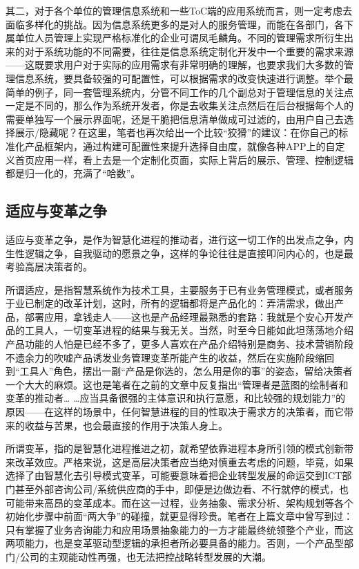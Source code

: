 \documentclass[]{book}
\begin{document}
其二，对于各个单位的管理信息系统和一些ToC端的应用系统而言，则一定考虑去面临多样化的挑战。因为信息系统更多的是对人的服务管理，而能在各部门，各下属单位人员管理上实现严格标准化的企业可谓凤毛麟角。不同的管理需求所衍生出来的对于系统功能的不同需要，往往是信息系统定制化开发中一个重要的需求来源------这既要求用户对于实际的应用需求有非常明确的理解，也要求我们大多数的管理信息系统，要具备较强的可配置性，可以根据需求的改变快速进行调整。举个最简单的例子，同一套管理系统内，分管不同工作的几个副总对于管理信息的关注点一定是不同的，那么作为系统开发者，你是去收集关注点然后在后台根据每个人的需要单独写一个展示界面呢，还是干脆把信息清单做成可过滤的，由用户自己去选择展示/隐藏呢？在这里，笔者也再次给出一个比较``狡猾''的建议：在你自己的标准化产品框架内，通过构建可配置性来提升选择自由度，就像各种APP上的自定义首页应用一样，看上去是一个定制化页面，实际上背后的展示、管理、控制逻辑都是归一化的，充满了``哈数''。

\hypertarget{ux9002ux5e94ux4e0eux53d8ux9769ux4e4bux4e89}{%
\subsection{适应与变革之争}\label{ux9002ux5e94ux4e0eux53d8ux9769ux4e4bux4e89}}

适应与变革之争，是作为智慧化进程的推动者，进行这一切工作的出发点之争，内生性逻辑之争，自我驱动的愿景之争，这样的争论往往是直接叩问内心的，也是最考验高层决策者的。

所谓适应，是指智慧系统作为技术工具，主要服务于已有业务管理模式，或者服务于业已制定的改革计划，这时，所有的逻辑都将是产品化的：弄清需求，做出产品，部署应用，拿钱走人------这也是产品经理最熟悉的套路：我就是个安心开发产品的工具人，一切变革进程的结果与我无关。当然，时至今日能如此坦荡荡地介绍产品功能的人怕是已经不多了，更多人喜欢在产品介绍特别是商务、技术营销阶段不遗余力的吹嘘产品诱发业务管理变革所能产生的收益，然后在实施阶段缩回到``工具人''角色，摆出一副``产品是你选的，怎么用是你的事''的姿态，留给决策者一个大大的麻烦。这也是笔者在之前的文章中反复指出``管理者是蓝图的绘制者和变革的推动者\ldots{} \ldots{}应当具备很强的主体意识和执行意愿，和比较强的规划能力''的原因------在这样的场景中，任何智慧进程的目的性取决于需求方的决策者，而它带来的收益与苦果，也会最直接的作用于决策人身上。

所谓变革，指的是智慧化进程推进之初，就希望依靠进程本身所引领的模式创新带来改革效应。严格来说，这是高层决策者应当绝对慎重去考虑的问题，毕竟，如果选择了由智慧化去引导模式变革，可能要意味着把企业转型发展的命运交到ICT部门甚至外部咨询公司/系统供应商的手中，即便是边做边看、不行就停的模式，也可能带来高昂的变革成本。而在这一过程，业务抽象、需求分析、架构规划等各个初始化步骤中前面``两大争''的碰撞，就更显得珍贵。笔者在上篇文章中曾写到过：只有掌握了业务咨询能力和应用场景抽象能力的一方才能最终统领整个产业，而这两项能力，也是变革驱动型逻辑的承担者所必要具备的能力。否则，一个产品型部门/公司的主观能动性再强，也无法把控战略转型发展的大潮。
\end{document}
